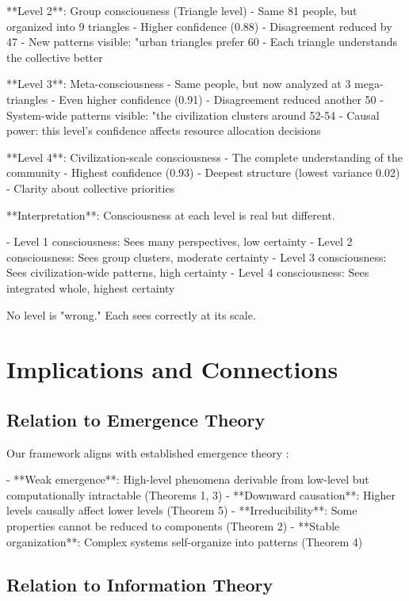 \documentclass[12pt,a4paper]{article}
\theoremstyle{definition}
\begin{document}
{**Level 2**: Group consciousness (Triangle level)
- Same 81 people, but organized into 9 triangles
- Higher confidence (0.88)
- Disagreement reduced by 47%
- New patterns visible: "urban triangles prefer 60%
- Each triangle understands the collective better

**Level 3**: Meta-consciousness
- Same people, but now analyzed at 3 mega-triangles
- Even higher confidence (0.91)
- Disagreement reduced another 50%
- System-wide patterns visible: "the civilization clusters around 52-54%
- Causal power: this level's confidence affects resource allocation decisions

**Level 4**: Civilization-scale consciousness
- The complete understanding of the community
- Highest confidence (0.93)
- Deepest structure (lowest variance 0.02)
- Clarity about collective priorities

**Interpretation**: Consciousness at each level is real but different.

- Level 1 consciousness: Sees many perspectives, low certainty
- Level 2 consciousness: Sees group clusters, moderate certainty
- Level 3 consciousness: Sees civilization-wide patterns, high certainty
- Level 4 consciousness: Sees integrated whole, highest certainty

No level is "wrong." Each sees correctly at its scale.

\section{Implications and Connections}

\subsection{Relation to Emergence Theory}

Our framework aligns with established emergence theory \citep{bedau2002dynamical, jaeger2010introducing}:

- **Weak emergence**: High-level phenomena derivable from low-level but computationally intractable (Theorems 1, 3)
- **Downward causation**: Higher levels causally affect lower levels (Theorem 5)
- **Irreducibility**: Some properties cannot be reduced to components (Theorem 2)
- **Stable organization**: Complex systems self-organize into patterns (Theorem 4)

\subsection{Relation to Information Theory}

}
\end{document}
